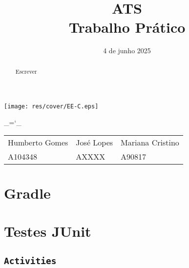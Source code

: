 \documentclass[12pt, a4paper]{article}
\title{\Huge \textbf{ATS \\ \Large Trabalho Prático}}
\date{4 de junho 2025}
\begin{document}
\begin{center}
    \texttt{[image: res/cover/EE-C.eps]}
\end{center}

\chardef\_=`_
\onehalfspacing
\setlength{\parskip}{\baselineskip}
\setlength{\parindent}{0pt}
\def\arraystretch{1.5}

{\let\newpage\relax\maketitle}
\maketitle
\thispagestyle{empty}

\vspace{\fill}

\begin{adjustwidth}{-2cm}{-2cm} %
    \begin{center}
        \begin{tabular}{>{\centering}p{}
                        >{\centering}p{}
                        >{\centering\arraybackslash}p{}}

            Humberto Gomes & José Lopes & Mariana Cristino \\
            A104348        & AXXXX      & A90817
        \end{tabular}
    \end{center}
\end{adjustwidth}

\pagebreak

\begin{abstract}
    Escrever
\end{abstract}

\section{Gradle}

\section{Testes JUnit}

\subsection{\texttt{Activities}}
\end{document}
